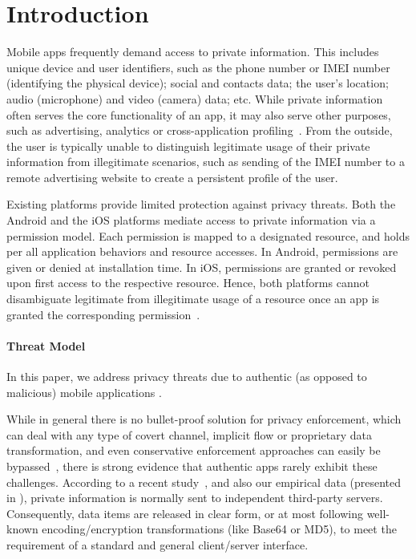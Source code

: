 \section{Introduction}\label{Se:introduction}

Mobile apps frequently demand access to private information. This includes unique device and user identifiers, such as the phone number or IMEI number (identifying the physical device); social and contacts data; the user's location; audio (microphone) and video (camera) data; etc. While private information often serves the core functionality of an app, it may also serve other purposes, such as advertising, analytics or cross-application profiling~\cite{HHJSW:CCS11}. From the outside, the user is typically unable to distinguish legitimate usage of their private information from illegitimate scenarios, such as sending of the IMEI number to a remote advertising website to create a persistent profile of the user. 

Existing platforms provide limited protection against privacy threats. Both the Android and the iOS platforms mediate access to private information via a permission model. Each permission is mapped to a designated resource, and holds per all application behaviors and resource accesses. In Android,  permissions are given or denied at installation time. In iOS, permissions are granted or revoked upon first access to the respective resource. Hence, both platforms cannot disambiguate legitimate from illegitimate usage of a resource once an app is granted the corresponding permission~\cite{HMNRSKZ:ASE13}.

\paragraph{Threat Model} In this paper, we address privacy threats due to authentic (as opposed to malicious) mobile applications .  

While in general there is no bullet-proof solution for privacy enforcement, which can deal with any type of covert channel, implicit flow or proprietary data transformation, and even conservative enforcement approaches can easily be bypassed~\cite{SMBK:SECRYPT13}, there is strong evidence that authentic apps rarely exhibit these challenges. According to a recent study~\cite{HHJSW:CCS11}, and also our empirical data (presented in ), private information is normally sent to independent third-party servers. Consequently, data items are released in clear form, or at most following well-known encoding/encryption transformations (like Base64 or MD5), to meet the requirement of a standard and general client/server interface. 

